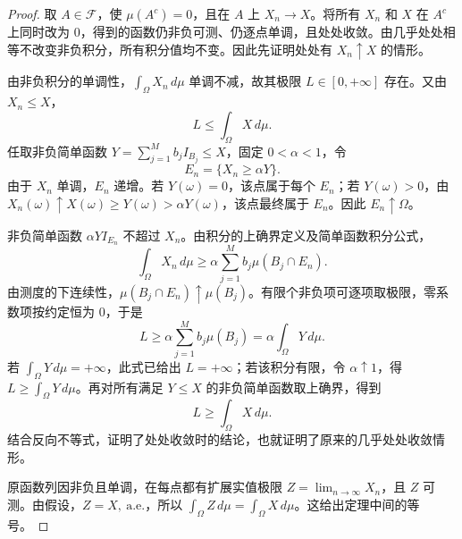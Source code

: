\begin{proof}
取 $A\in\mathcal F$，使 $\mu(A^c)=0$，且在 $A$ 上 $X_n\to X$。将所有 $X_n$ 和 $X$ 在 $A^c$ 上同时改为 $0$，得到的函数仍非负可测、仍逐点单调，且处处收敛。由几乎处处相等不改变非负积分，所有积分值均不变。因此先证明处处有 $X_n\uparrow X$ 的情形。

由非负积分的单调性，$\displaystyle\int_\Omega X_n\,d\mu$ 单调不减，故其极限 $L\in[0,+\infty]$ 存在。又由 $X_n\leq X$，
\[
L\leq\int_\Omega X\,d\mu.
\]
任取非负简单函数 $Y=\sum_{j=1}^M b_jI_{B_j}\leq X$，固定 $0<\alpha<1$，令
\[
E_n=\{X_n\geq\alpha Y\}.
\]
由于 $X_n$ 单调，$E_n$ 递增。若 $Y(\omega)=0$，该点属于每个 $E_n$；若 $Y(\omega)>0$，由 $X_n(\omega)\uparrow X(\omega)\geq Y(\omega)>\alpha Y(\omega)$，该点最终属于 $E_n$。因此 $E_n\uparrow\Omega$。

非负简单函数 $\alpha YI_{E_n}$ 不超过 $X_n$。由积分的上确界定义及简单函数积分公式，
\[
\int_\Omega X_n\,d\mu
\geq\alpha\sum_{j=1}^M b_j\mu(B_j\cap E_n).
\]
由测度的下连续性，$\mu(B_j\cap E_n)\uparrow\mu(B_j)$。有限个非负项可逐项取极限，零系数项按约定恒为 $0$，于是
\[
L\geq\alpha\sum_{j=1}^M b_j\mu(B_j)
=\alpha\int_\Omega Y\,d\mu.
\]
若 $\displaystyle\int_\Omega Y\,d\mu=+\infty$，此式已给出 $L=+\infty$；若该积分有限，令 $\alpha\uparrow1$，得 $L\geq\displaystyle\int_\Omega Y\,d\mu$。再对所有满足 $Y\leq X$ 的非负简单函数取上确界，得到
\[
L\geq\int_\Omega X\,d\mu.
\]
结合反向不等式，证明了处处收敛时的结论，也就证明了原来的几乎处处收敛情形。

原函数列因非负且单调，在每点都有扩展实值极限 $Z=\lim_{n\to\infty}X_n$，且 $Z$ 可测。由假设，$Z=X,\ \mathrm{a.e.}$，所以 $\displaystyle\int_\Omega Z\,d\mu=\int_\Omega X\,d\mu$。这给出定理中间的等号。
\end{proof}

